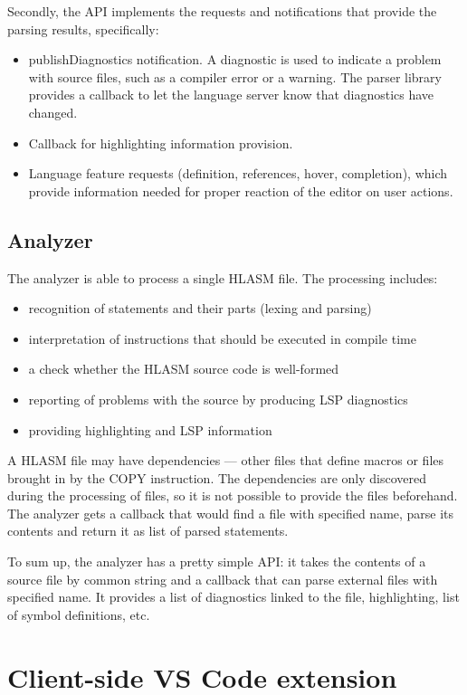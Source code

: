 Secondly, the API implements the requests and notifications that provide the parsing results, specifically:
\begin{itemize}
	\item publishDiagnostics notification. A diagnostic is used to indicate a problem with source files, such as a compiler error or a warning. The parser library provides a callback to let the language server know that diagnostics have changed.
	\item Callback for highlighting information provision.
	\item Language feature requests (definition, references, hover, completion), which provide information needed for proper reaction of the editor on user actions.
\end{itemize}

\subsection{Analyzer}

The analyzer is able to process a single HLASM file. The processing includes:
\begin{itemize}
 \item recognition of statements and their parts (lexing and parsing)
 \item interpretation of instructions that should be executed in compile time
 \item a check whether the HLASM source code is well-formed
 \item reporting of problems with the source by producing LSP diagnostics
 \item providing highlighting and LSP information
\end{itemize}

A HLASM file may have dependencies --- other files that define macros or files brought in by the COPY instruction. The dependencies are only discovered during the processing of files, so it is not possible to provide the files beforehand. The analyzer gets a callback that would find a file with specified name, parse its contents and return it as list of parsed statements. 

To sum up, the analyzer has a pretty simple API: it takes the contents of a source file by common string and a callback that can parse external files with specified name. It provides a list of diagnostics linked to the file, highlighting, list of symbol definitions, etc.

\section{Client-side VS Code extension}
\label{arch:client}

